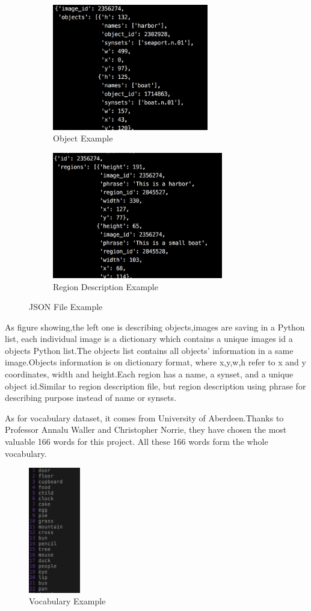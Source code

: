 \documentclass[12pt,a4paper]{report}
\begin{document}
\begin{figure}[h]
\begin{subfigure}{0.5\linewidth}
	\includegraphics[height=5.5cm,width=\textwidth]{object.png}
	\caption{Object Example}
\end{subfigure}
\begin{subfigure}{0.5\linewidth}
	\includegraphics[height=5.5cm,width=\textwidth]{region.png}
	\caption{Region Description Example}
\end{subfigure}
\label{dataset example}
\caption{JSON File Example}
\end{figure}
As figure showing,the left one is describing objects,images are saving in a Python list, each individual image is a dictionary which contains a unique images id a objects Python list.The objects list contains all objects' information in a same image.Objects information is on dictionary format, where x,y,w,h refer to x and y coordinates, width and height.Each region has a  name, a synset, and a unique object id.Similar to region description file, but region description using phrase for describing purpose instead of name or synsets.


As for vocabulary dataset, it comes from University of Aberdeen.Thanks to Professor Annalu Waller and Christopher Norrie, they have chosen the most valuable 166  words for this project. All these 166 words form the whole vocabulary.

\begin{figure}[h]
\centering
\includegraphics[width=0.2\textwidth]{vocab.png}
\caption{Vocabulary Example}
\end{figure}
\end{document}
